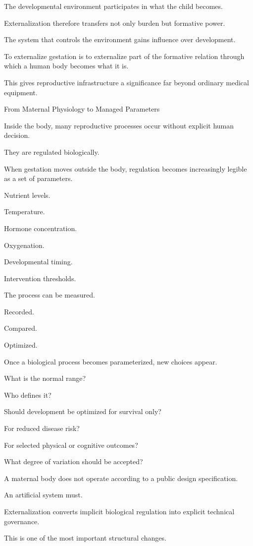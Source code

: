 The developmental environment participates in what the child becomes.

Externalization therefore transfers not only burden but formative power.

The system that controls the environment gains influence over development.

To externalize gestation is to externalize part of the formative relation through which a human body becomes what it is.

This gives reproductive infrastructure a significance far beyond ordinary medical equipment.

From Maternal Physiology to Managed Parameters

Inside the body, many reproductive processes occur without explicit human decision.

They are regulated biologically.

When gestation moves outside the body, regulation becomes increasingly legible as a set of parameters.

Nutrient levels.

Temperature.

Hormone concentration.

Oxygenation.

Developmental timing.

Intervention thresholds.

The process can be measured.

Recorded.

Compared.

Optimized.

Once a biological process becomes parameterized, new choices appear.

What is the normal range?

Who defines it?

Should development be optimized for survival only?

For reduced disease risk?

For selected physical or cognitive outcomes?

What degree of variation should be accepted?

A maternal body does not operate according to a public design specification.

An artificial system must.

Externalization converts implicit biological regulation into explicit technical governance.

This is one of the most important structural changes.

